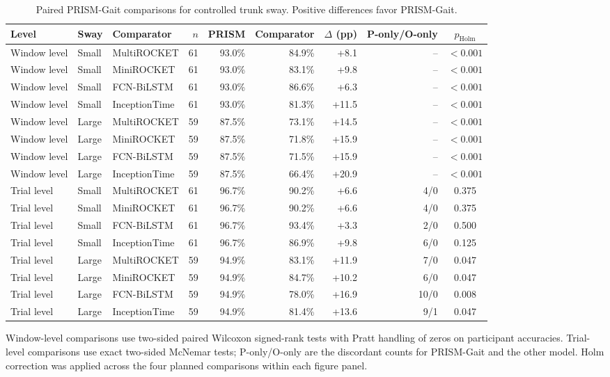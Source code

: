 \begin{table}[t]
\caption{Paired PRISM-Gait comparisons for controlled trunk sway. Positive differences favor PRISM-Gait.}
\label{tab:sway_pairwise_statistics}
\centering
\small
\setlength{\tabcolsep}{3.5pt}
\renewcommand{\arraystretch}{1.16}
\begin{adjustbox}{max width=\textwidth}
\begin{tabular}{lllrrrrrc}
\toprule
Level & Sway & Comparator & $n$ & PRISM & Comparator & $\Delta$ (pp) & P-only/O-only & $p_{\mathrm{Holm}}$ \\
\midrule
Window level & Small & MultiROCKET & 61 & 93.0\% & 84.9\% & +8.1 & -- & $<0.001$ \\
Window level & Small & MiniROCKET & 61 & 93.0\% & 83.1\% & +9.8 & -- & $<0.001$ \\
Window level & Small & FCN-BiLSTM & 61 & 93.0\% & 86.6\% & +6.3 & -- & $<0.001$ \\
Window level & Small & InceptionTime & 61 & 93.0\% & 81.3\% & +11.5 & -- & $<0.001$ \\
\addlinespace[2pt]
Window level & Large & MultiROCKET & 59 & 87.5\% & 73.1\% & +14.5 & -- & $<0.001$ \\
Window level & Large & MiniROCKET & 59 & 87.5\% & 71.8\% & +15.9 & -- & $<0.001$ \\
Window level & Large & FCN-BiLSTM & 59 & 87.5\% & 71.5\% & +15.9 & -- & $<0.001$ \\
Window level & Large & InceptionTime & 59 & 87.5\% & 66.4\% & +20.9 & -- & $<0.001$ \\
\addlinespace[2pt]
Trial level & Small & MultiROCKET & 61 & 96.7\% & 90.2\% & +6.6 & 4/0 & 0.375 \\
Trial level & Small & MiniROCKET & 61 & 96.7\% & 90.2\% & +6.6 & 4/0 & 0.375 \\
Trial level & Small & FCN-BiLSTM & 61 & 96.7\% & 93.4\% & +3.3 & 2/0 & 0.500 \\
Trial level & Small & InceptionTime & 61 & 96.7\% & 86.9\% & +9.8 & 6/0 & 0.125 \\
\addlinespace[2pt]
Trial level & Large & MultiROCKET & 59 & 94.9\% & 83.1\% & +11.9 & 7/0 & 0.047 \\
Trial level & Large & MiniROCKET & 59 & 94.9\% & 84.7\% & +10.2 & 6/0 & 0.047 \\
Trial level & Large & FCN-BiLSTM & 59 & 94.9\% & 78.0\% & +16.9 & 10/0 & 0.008 \\
Trial level & Large & InceptionTime & 59 & 94.9\% & 81.4\% & +13.6 & 9/1 & 0.047 \\
\bottomrule
\end{tabular}
\end{adjustbox}
\vspace{2pt}
\parbox{0.98\textwidth}{\footnotesize Window-level comparisons use two-sided paired Wilcoxon signed-rank tests with Pratt handling of zeros on participant accuracies. Trial-level comparisons use exact two-sided McNemar tests; P-only/O-only are the discordant counts for PRISM-Gait and the other model. Holm correction was applied across the four planned comparisons within each figure panel.}
\end{table}
